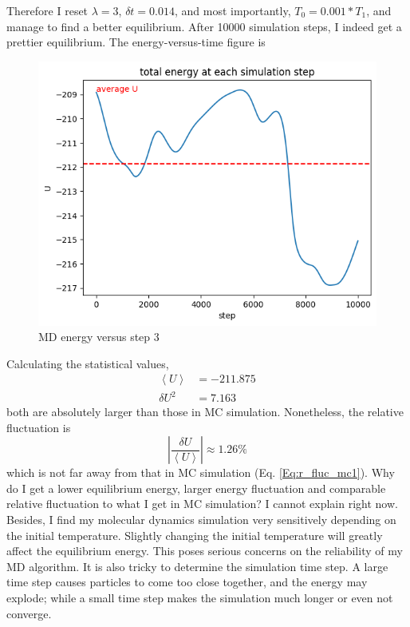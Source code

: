 \documentclass[letterpaper,12pt]{article}
\numberwithin{equation}{section}
\begin{document}
\begin{enumerate}[label=(\alph*)]
    Therefore I reset $\lambda=3$, $\delta t=0.014$, and most importantly, $T_0=0.001*T_1$, and manage to find a better equilibrium. After 10000 simulation steps, I indeed get a prettier equilibrium. The energy-versus-time figure is 
    \begin{figure}[H]
        \centering
        \includegraphics{Project/energy_to_time_md3.png}
        \caption{MD energy versus step 3}
        \label{fig:energy_to_time_md3}
    \end{figure}
    Calculating the statistical values, 
    \begin{equation}
        \begin{aligned}
            \left\langle U\right\rangle&=-211.875 \\
            \delta U^2&=7.163
        \end{aligned}
    \end{equation}
    both are absolutely larger than those in MC simulation. Nonetheless, the relative fluctuation is 
    \begin{equation}
        \left| \frac{\delta U}{\left \langle U\right\rangle} \right|\approx 1.26\%
    \end{equation}
    which is not far away from that in MC simulation (Eq. \ref{Eq:r_fluc_mc1}). Why do I get a lower equilibrium energy, larger energy fluctuation and comparable relative fluctuation to what I get in MC simulation? I cannot explain right now. Besides, I find my molecular dynamics simulation very sensitively depending on the initial temperature. Slightly changing the initial temperature will greatly affect the equilibrium energy. This poses serious concerns on the reliability of my MD algorithm. It is also tricky to determine the simulation time step. A large time step causes particles to come too close together, and the energy may explode; while a small time step makes the simulation much longer or even not converge. 


\end{enumerate}
\end{document}
